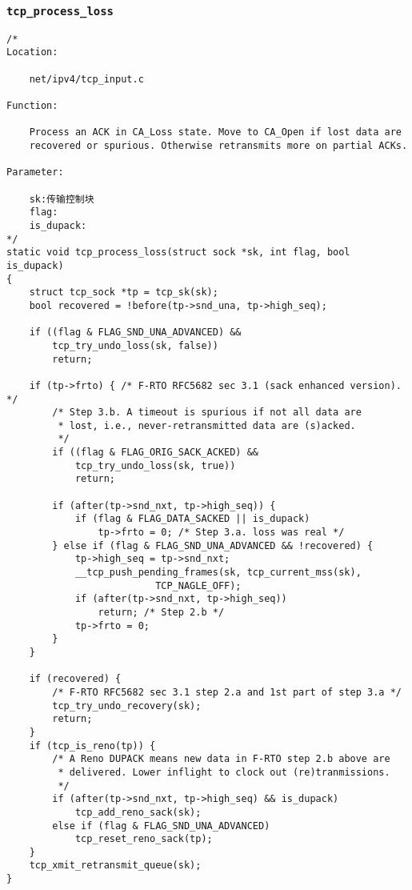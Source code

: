 		\subsubsection{\texttt{tcp_process_loss}}
\begin{verbatim}
/* 
Location:

	net/ipv4/tcp_input.c

Function:

	Process an ACK in CA_Loss state. Move to CA_Open if lost data are
	recovered or spurious. Otherwise retransmits more on partial ACKs.

Parameter:

	sk:传输控制块
	flag:
	is_dupack:
*/
static void tcp_process_loss(struct sock *sk, int flag, bool is_dupack)
{
	struct tcp_sock *tp = tcp_sk(sk);
	bool recovered = !before(tp->snd_una, tp->high_seq);

	if ((flag & FLAG_SND_UNA_ADVANCED) &&
	    tcp_try_undo_loss(sk, false))
		return;

	if (tp->frto) { /* F-RTO RFC5682 sec 3.1 (sack enhanced version). */
		/* Step 3.b. A timeout is spurious if not all data are
		 * lost, i.e., never-retransmitted data are (s)acked.
		 */
		if ((flag & FLAG_ORIG_SACK_ACKED) &&
		    tcp_try_undo_loss(sk, true))
			return;

		if (after(tp->snd_nxt, tp->high_seq)) {
			if (flag & FLAG_DATA_SACKED || is_dupack)
				tp->frto = 0; /* Step 3.a. loss was real */
		} else if (flag & FLAG_SND_UNA_ADVANCED && !recovered) {
			tp->high_seq = tp->snd_nxt;
			__tcp_push_pending_frames(sk, tcp_current_mss(sk),
						  TCP_NAGLE_OFF);
			if (after(tp->snd_nxt, tp->high_seq))
				return; /* Step 2.b */
			tp->frto = 0;
		}
	}

	if (recovered) {
		/* F-RTO RFC5682 sec 3.1 step 2.a and 1st part of step 3.a */
		tcp_try_undo_recovery(sk);
		return;
	}
	if (tcp_is_reno(tp)) {
		/* A Reno DUPACK means new data in F-RTO step 2.b above are
		 * delivered. Lower inflight to clock out (re)tranmissions.
		 */
		if (after(tp->snd_nxt, tp->high_seq) && is_dupack)
			tcp_add_reno_sack(sk);
		else if (flag & FLAG_SND_UNA_ADVANCED)
			tcp_reset_reno_sack(tp);
	}
	tcp_xmit_retransmit_queue(sk);
}
\end{verbatim}
